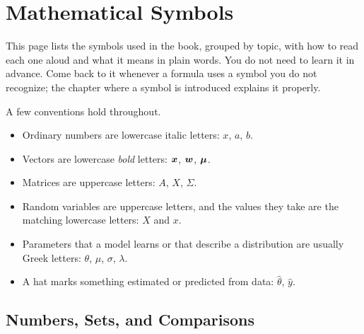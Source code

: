 \chapter{Mathematical Symbols}
\raggedbottom

This page lists the symbols used in the book, grouped by topic, with
how to read each one aloud and what it means in plain words. You do not
need to learn it in advance. Come back to it whenever a formula uses a
symbol you do not recognize; the chapter where a symbol is introduced
explains it properly.

A few conventions hold throughout.
\begin{itemize}
  \item Ordinary numbers are lowercase italic letters: $x$, $a$, $b$.
  \item Vectors are lowercase \emph{bold} letters: $\bm{x}$, $\bm{w}$,
    $\bm{\mu}$.
  \item Matrices are uppercase letters: $A$, $X$, $\Sigma$.
  \item Random variables are uppercase letters, and the values they take
    are the matching lowercase letters: $X$ and $x$.
  \item Parameters that a model learns or that describe a distribution
    are usually Greek letters: $\theta$, $\mu$, $\sigma$, $\lambda$.
  \item A hat marks something estimated or predicted from data:
    $\hat\theta$, $\hat{y}$.
\end{itemize}

\newcommand{\symtable}[1]{%
  \par\smallskip
  \begin{center}\small
  \begin{tabular}{@{}>{\raggedright\arraybackslash}p{0.17\textwidth}
      >{\raggedright\arraybackslash}p{0.25\textwidth}
      >{\raggedright\arraybackslash}p{0.52\textwidth}@{}}
    \toprule
    Symbol & Read as & Meaning \\
    \midrule
    #1
    \bottomrule
  \end{tabular}
  \end{center}}

\section*{Numbers, Sets, and Comparisons}

